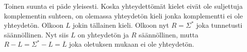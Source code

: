 \documentclass[a4paper,11pt, draft]{article}
\begin{document}
\begin{enumerate}
\begin{enumerate}
      Toinen suunta ei päde yleisesti. Koska yhteydettömät kielet eivät ole
      suljettuja komplementin suhteen, on olemassa yhteydetön kieli jonka
      komplementti ei ole yhteydetön. Olkoon $L$ jokin tällainen kieli. Olkoon
      nyt $R = \Sigma^*$ joka tunnetusti säännöllinen. Nyt siis $L$ on
      yhteydetön ja $R$ säännöllinen, mutta $R - L = \Sigma^* - L =
      \overline{L}$ joka oletuksen mukaan ei ole yhteydetön.
    \end{enumerate}
\end{enumerate}
\end{document}
